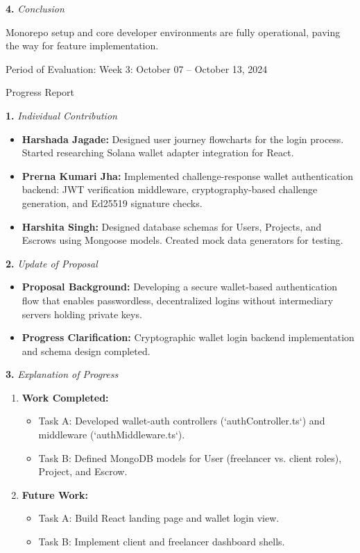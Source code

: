 \documentclass[12pt]{article}
\newcommand{\phasetitle}[1]{{\large Period of Evaluation: #1}\par\vspace{4pt}}
\newcommand{\progressreport}{{\large Progress Report}\par\vspace{4pt}}
\newcommand{\subhead}[2]{\textbf{#1.} \textit{#2}\par}
\begin{document}
\subhead{4}{Conclusion}
Monorepo setup and core developer environments are fully operational, paving the way for feature implementation.

\newpage

\phasetitle{Week 3: October 07 -- October 13, 2024}

\progressreport

\subhead{1}{Individual Contribution}
\begin{itemize}[leftmargin=2em]
    \item \textbf{Harshada Jagade:} Designed user journey flowcharts for the login process. Started researching Solana wallet adapter integration for React.
    \item \textbf{Prerna Kumari Jha:} Implemented challenge-response wallet authentication backend: JWT verification middleware, cryptography-based challenge generation, and Ed25519 signature checks.
    \item \textbf{Harshita Singh:} Designed database schemas for Users, Projects, and Escrows using Mongoose models. Created mock data generators for testing.
\end{itemize}

\subhead{2}{Update of Proposal}
\begin{itemize}[leftmargin=2em]
    \item \textbf{Proposal Background:} Developing a secure wallet-based authentication flow that enables passwordless, decentralized logins without intermediary servers holding private keys.
    \item \textbf{Progress Clarification:} Cryptographic wallet login backend implementation and schema design completed.
\end{itemize}

\newpage

\subhead{3}{Explanation of Progress}
\begin{enumerate}[leftmargin=2em]
    \item \textbf{Work Completed:}
    \begin{itemize}[leftmargin=2em]
        \item Task A: Developed wallet-auth controllers (`authController.ts`) and middleware (`authMiddleware.ts`).
        \item Task B: Defined MongoDB models for User (freelancer vs. client roles), Project, and Escrow.
    \end{itemize}
    \item \textbf{Future Work:}
    \begin{itemize}[leftmargin=2em]
        \item Task A: Build React landing page and wallet login view.
        \item Task B: Implement client and freelancer dashboard shells.
    \end{itemize}
\end{enumerate}
\end{document}

